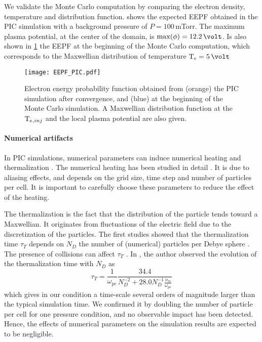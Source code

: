     We validate the Monte Carlo computation by comparing the electron density, temperature and distribution function.
     shows the expected EEPF obtained in the \ac{PIC} simulation with a background pressure of $P=100$\,mTorr.
    The maximum plasma potential, at the center of the domain, is $\max(\phi)=12.2\,\volt$.
    Is also shown in \cref{fig-EEPF_start_end} the EEPF at the beginning of the Monte Carlo computation, which corresponds to the Maxwellian distribution of temperature $\Te=5\,\volt$

    \begin{figure}[!hbt]
      \centering
      \texttt{[image: EEPF\_PIC.pdf]}
      \caption{Electron energy probability function obtained from (orange) the PIC simulation after convergence, and (blue) at the beginning of the Monte Carlo simulation. A Maxwellian distribution function at the $\mathrm{T_e}{}_{,inj}$ and the local plasma potential are also given.}
      \label{fig-EEPF_start_end}
    \end{figure}

    \paragraph{Numerical artifacts \\}
    In PIC simulations, numerical parameters can induce numerical heating and thermalization \citep{lai2014}.
    The numerical heating has been studied in detail \citep{birdsall1991}.
    It is due to aliasing effects, and depends on the grid size, time step and number of particles per cell.
    It is important to carefully choose these parameters to reduce the effect of the heating.

    The thermalization is the fact that the distribution of the particle tends toward a Maxwellian.
    It originates from fluctuations of the electric field due to the discretization of the particles.
    The first studies showed that the thermalization time $\tau_T$ depends on $N_D$ the number of (numerical) particles per Debye sphere \citep{dawson1964,montgomery1970}.
    The presence of collisions can affect $\tau_T$  \citep{turner2006,lai2014}.
    In \citet{turner2006}, the author observed the evolution of the thermalization time with $N_D$ as
    \begin{equation} \label{eq-taut}
      \tau_T = \frac{1}{\omega_{pe}} \frac{34.4}{N_D^{-2} + 28.0 N_D^{-1} \frac{\nu_m}{\omega_{pe}}}
    \end{equation}
    which gives in our condition a time-scale several orders of magnitude larger than the typical simulation time.
    We confirmed it by doubling the number of particle per cell for one pressure condition, and no observable impact has been detected.
    Hence, the effects of numerical parameters on the simulation results are expected to be negligible.

